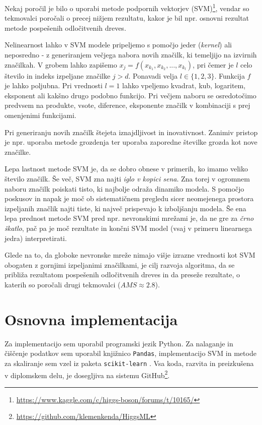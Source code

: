 \documentclass[11pt,a4paper,openany]{book}
\begin{document}
Nekaj poročil je bilo o uporabi metode podpornih vektorjev (SVM)\footnote{\url{https://www.kaggle.com/c/higgs-boson/forums/t/10165/}}, vendar so tekmovalci poročali o precej nižjem rezultatu, kakor je bil npr. osnovni rezultat metode pospešenih odločitvenih dreves.

Nelinearnost lahko v SVM modele pripeljemo s pomočjo jeder (\textit{kernel}) ali neposredno - z generiranjem večjega nabora novih značilk, ki temeljijo na izvirnih značilkah. V grobem lahko zapišemo $x_j = f(x_{k_1}, x_{k_2}, ..., x_{k_l})$, pri čemer je $l$ celo število in indeks izpeljane značilke $j > d$. Ponavadi velja $l \in \{1, 2, 3\}$. Funkcija $f$ je lahko poljubna. Pri vrednosti $l = 1$ lahko vpeljemo kvadrat, kub, logaritem, eksponent ali kakšno drugo podobno funkcijo. Pri večjem naboru se osredotočimo predvsem na produkte, vsote, diference, eksponente značilk v kombinaciji s prej omenjenimi funkcijami. 

Pri generiranju novih značilk štejeta iznajdljivost in inovativnost. Zanimiv pristop je npr. uporaba metode grozdenja ter uporaba zaporedne številke grozda kot nove značilke.

Lepa lastnost metode SVM je, da se dobro obnese v primerih, ko imamo veliko število značilk. Še več, SVM zna najti \textit{iglo v kopici sena}. Zna torej v ogromnem naboru značilk poiskati tisto, ki najbolje odraža dinamiko modela. S pomočjo poskusov in napak je moč ob sistematičnem pregledu sicer neomejenega prostora izpeljanih značlik najti tiste, ki največ prispevajo k izboljšanju modela. Še ena lepa prednost metode SVM pred npr. nevronskimi mrežami je, da ne gre za \textit{črno škatlo}, pač pa je moč rezultate in končni SVM model (vsaj v primeru linearnega jedra) interpretirati.

Glede na to, da globoke nevronske mreže nimajo višje izrazne vrednosti kot SVM obogaten z gornjimi izpeljanimi značilkami, je cilj razvoja algoritma, da se približa rezultatom pospešenih odločitvenih dreves in da preseže rezultate, o katerih so poročali drugi tekmovalci ($AMS \approx \num{2,8}$).


\section{Osnovna implementacija}
Za implementacijo sem uporabil programski jezik Python. Za nalaganje in čiščenje podatkov sem uporabil knjižnico \texttt{Pandas}, implementacijo SVM in metode za skaliranje sem vzel iz paketa \texttt{scikit-learn} \cite{scikit-learn}. Vsa koda, razvita in preizkušena v diplomskem delu, je dosegljiva na sistemu GitHub\footnote{\url{https://github.com/klemenkenda/HiggsML}}.
\end{document}
